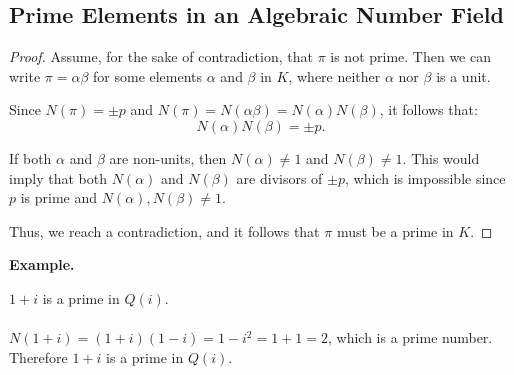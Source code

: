 \documentclass{article}
\newenvironment{example}{%
    \par
    \vspace{5pt}
	\begin{minipage}{\textwidth}
		\noindent\textbf{Example.}
		\tcolorbox[blanker,breakable,left=5mm,parbox=false,
	    before upper={\parindent15pt},
	    after skip=10pt,
		borderline west={1mm}{0pt}{cyan!10!white}]
}{%
		\endtcolorbox
	\end{minipage}
    \vspace{5pt}
}
\begin{document}
\subsection{Prime Elements in an Algebraic Number Field}



\begin{proof}Assume, for the sake of contradiction, that \( \pi \) is not prime. Then we can write \( \pi = \alpha \beta \) for some elements \( \alpha \) and \( \beta \) in \( K \), where neither \( \alpha \) nor \( \beta \) is a unit.

    Since \( N(\pi) = \pm p \) and \( N(\pi) = N(\alpha \beta) = N(\alpha) N(\beta) \), it follows that:
    \[
    N(\alpha) N(\beta) = \pm p.
    \]
    
    If both \( \alpha \) and \( \beta \) are non-units, then \( N(\alpha) \neq 1 \) and \( N(\beta) \neq 1 \). This would imply that both \( N(\alpha) \) and \( N(\beta) \) are divisors of \( \pm p \), which is impossible since \( p \) is prime and \( N(\alpha), N(\beta) \neq 1 \).
    
    Thus, we reach a contradiction, and it follows that \( \pi \) must be a prime in \( K \).
    \end{proof}

\begin{example}
$1 + i$ is a prime in $Q(i)$.\\\\
$N(1 + i) = (1 + i)(1 - i) = 1 - i^2 = 1 + 1 = 2$, which is a prime number. Therefore $1 + i$ is a prime in $Q(i)$.
\end{example}
\end{document}
